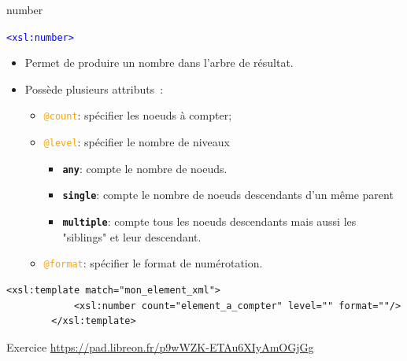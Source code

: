 \begin{frame}[fragile]{number}
    \begin{block}{\textcolor{blue}{\texttt{<xsl:number>}}}
        \begin{itemize}
            \item Permet de produire un nombre dans l'arbre de résultat.
            \item Possède plusieurs attributs~:
            \begin{itemize}
                \item \textcolor{orange}{\texttt{@count}}: spécifier les noeuds à compter;
                \item \textcolor{orange}{\texttt{@level}}: spécifier le nombre de niveaux
                \begin{itemize}
                    \item \texttt{\textbf{any}}: compte le nombre de noeuds.
                    \item \texttt{\textbf{single}}: compte le nombre de noeuds descendants d'un même parent
                    \item \texttt{\textbf{multiple}}: compte tous les noeuds descendants mais aussi les "siblings" et leur descendant.
                \end{itemize}
                \item \textcolor{orange}{\texttt{@format}}: spécifier le format de numérotation.
            \end{itemize}
        \end{itemize}
        \begin{lstlisting}[numbers=none]
        <xsl:template match="mon_element_xml">
            <xsl:number count="element_a_compter" level="" format=""/>
        </xsl:template>
    \end{lstlisting}
    \end{block}
    
\end{frame}

\begin{frame}[fragile]{Exercice}
    \url{https://pad.libreon.fr/p9wWZK-ETAu6XIyAmOGjGg}
\end{frame}
